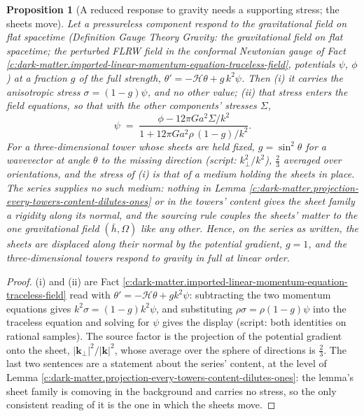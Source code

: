 \documentclass[11pt]{article}
\newtheorem{proposition}[theorem]{Proposition}
\theoremstyle{definition}
\theoremstyle{plain}
\newcommand{\changedmark}[2]{\marginpar{\raggedright\scriptsize\color{#1}#2}}
\providecommand{\hb}{}\renewcommand{\hb}{\bar{h}}
\begin{document}
\begin{proposition}[A reduced response to gravity needs a supporting stress; the sheets move]\label{c:dark-matter.reduced-response-gravity-needs-supporting-stress}
\changedmark{gray}{reworded}
Let a pressureless component respond to the gravitational field on flat spacetime (Definition \emph{Gauge Theory Gravity: the gravitational field on flat spacetime}; the perturbed FLRW field in the conformal Newtonian gauge of Fact \ref{c:dark-matter.imported-linear-momentum-equation-traceless-field}, potentials $\psi$, $\phi$) at a fraction $g$ of the full strength, $\theta' = -\mathcal{H}\theta + g\,k^{2}\psi$. Then (i) it carries the anisotropic stress $\sigma = (1 - g)\psi$, and no other value; (ii) that stress enters the field equations, so that with the other components' stresses $\Sigma$,
\[
\psi \;=\; \frac{\phi - 12\pi G a^{2}\Sigma/k^{2}}{1 + 12\pi G a^{2}\rho\,(1 - g)/k^{2}} .
\]
For a three-dimensional tower whose sheets are held fixed, $g = \sin^{2}\theta$ for a wavevector at angle $\theta$ to the missing direction (script: $k_{\perp}^{2}/k^{2}$), $\tfrac{2}{3}$ averaged over orientations, and the stress of (i) is that of a medium holding the sheets in place. The series supplies no such medium: nothing in Lemma \ref{c:dark-matter.projection-every-towers-content-dilutes-ones} or in the towers' content gives the sheet family a rigidity along its normal, and the sourcing rule couples the sheets' matter to the one gravitational field $(\hb, \Omega)$ like any other. Hence, on the series as written, the sheets are displaced along their normal by the potential gradient, $g = 1$, and the three-dimensional towers respond to gravity in full at linear order.
\end{proposition}
\begin{proof}
(i) and (ii) are Fact \ref{c:dark-matter.imported-linear-momentum-equation-traceless-field} read with $\theta' = -\mathcal{H}\theta + gk^{2}\psi$: subtracting the two momentum equations gives $k^{2}\sigma = (1 - g)k^{2}\psi$, and substituting $\rho\sigma = \rho(1 - g)\psi$ into the traceless equation and solving for $\psi$ gives the display (script: both identities on rational samples). The source factor is the projection of the potential gradient onto the sheet, $|\mathbf{k}_{\perp}|^{2}/|\mathbf{k}|^{2}$, whose average over the sphere of directions is $\tfrac{2}{3}$. The last two sentences are a statement about the series' content, at the level of Lemma \ref{c:dark-matter.projection-every-towers-content-dilutes-ones}: the lemma's sheet family is comoving in the background and carries no stress, so the only consistent reading of it is the one in which the sheets move.

\end{proof}
\end{document}
